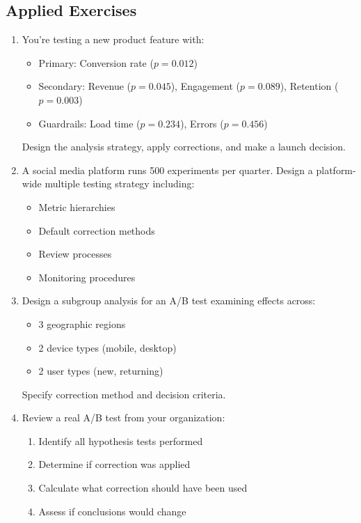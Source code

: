 \subsection{Applied Exercises}

\begin{enumerate}
    \item You're testing a new product feature with:
    \begin{itemize}
        \item Primary: Conversion rate ($p = 0.012$)
        \item Secondary: Revenue ($p = 0.045$), Engagement ($p = 0.089$), Retention ($p = 0.003$)
        \item Guardrails: Load time ($p = 0.234$), Errors ($p = 0.456$)
    \end{itemize}
    Design the analysis strategy, apply corrections, and make a launch decision.

    \item A social media platform runs 500 experiments per quarter. Design a platform-wide multiple testing strategy including:
    \begin{itemize}
        \item Metric hierarchies
        \item Default correction methods
        \item Review processes
        \item Monitoring procedures
    \end{itemize}

    \item Design a subgroup analysis for an A/B test examining effects across:
    \begin{itemize}
        \item 3 geographic regions
        \item 2 device types (mobile, desktop)
        \item 2 user types (new, returning)
    \end{itemize}
    Specify correction method and decision criteria.

    \item Review a real A/B test from your organization:
    \begin{enumerate}
        \item Identify all hypothesis tests performed
        \item Determine if correction was applied
        \item Calculate what correction should have been used
        \item Assess if conclusions would change
    \end{enumerate}
\end{enumerate}

